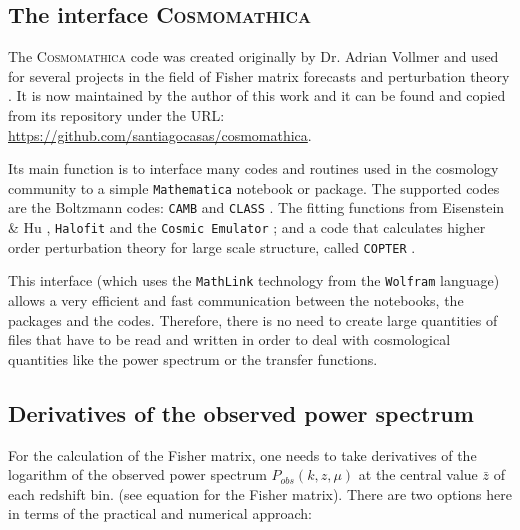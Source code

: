 \subsection{The interface \textsc{Cosmomathica} \label{sub:cosmomathica}}

The \textsc{Cosmomathica} code was created originally by Dr. Adrian Vollmer and used 
for several projects in the field of Fisher matrix forecasts and perturbation theory \cite{papers by Adrian}.
It is now maintained by the author of this work and it can be found 
and copied from its repository under the URL: \url{https://github.com/santiagocasas/cosmomathica}.

Its main function is to interface many codes and routines used in the cosmology community to a simple \texttt{Mathematica} notebook
or package.
The supported codes are the Boltzmann codes: \texttt{CAMB} \cite{lewis_efficient_2000} and \texttt{CLASS} \cite{lesgourges}.
The fitting functions from Eisenstein \& Hu \cite{cite Eisenstein}, \texttt{Halofit} \cite{smith} and the \texttt{Cosmic Emulator}
\cite{heitmann_coyote_2010, heitmann_coyote_2014}; and a code that calculates higher order perturbation theory for large scale structure, 
called \texttt{COPTER} \cite{find citation}.

This interface (which uses the \texttt{MathLink} technology from the \texttt{Wolfram} language) allows a very efficient and fast communication
between the notebooks, the packages and the codes. Therefore, there is no need to create large quantities of files that have to be read
and written in order to deal with cosmological quantities like the power spectrum or the transfer functions.


\subsection{Derivatives of the observed power spectrum}



For the calculation of the Fisher matrix, one needs to take derivatives
of the logarithm of the observed power spectrum $P_{obs}(k,z,\mu)$
at the central value $\bar{z}$ of each redshift bin. (see equation
for the Fisher matrix). There are two options here in terms of the
practical and numerical approach: 

